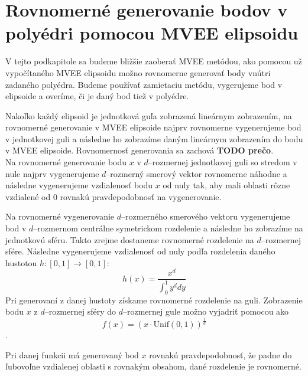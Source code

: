 \section {Rovnomerné generovanie bodov v polyédri pomocou MVEE elipsoidu}

V tejto podkapitole sa budeme bližšie zaoberať MVEE metódou, ako pomocou už vypočítaného MVEE elipsoidu možno rovnomerne generovať body vnútri zadaného polyédra. Budeme používať zamietaciu metódu, vygerujeme bod v elipsoide a overíme, či je daný bod tiež v polyédre.

Nakoľko každý elipsoid je jednotková guľa zobrazená lineárnym zobrazením, na rovnomerné generovanie v MVEE elipsoide najprv rovnomerne vygenerujeme bod v jednotkovej guli a následne ho zobrazíme daným lineárnym zobrazením do bodu v MVEE elipsoide. Rovnomernosť generovania sa zachová \textbf{TODO prečo}.\\

Na rovnomerné generovanie bodu $x$ v $d$--rozmernej jednotkovej guli so stredom v nule najprv vygenerujeme $d$--rozmerný smerový vektor rovnomerne náhodne a následne vygenerujeme vzdialenosť bodu $x$ od nuly tak, aby mali oblasti rôzne vzdialené od $0$ rovnakú pravdepodobnosť na vygenerovanie.

Na rovnomerné vygenerovanie $d$--rozmerného smerového vektoru vygenerujeme bod v $d$--rozmernom centrálne symetrickom rozdelenie a následne ho zobrazíme na jednotkovú sféru. Takto zrejme dostaneme rovnomerné rozdelenie na $d$--rozmernej sfére. Následne vygenerujeme vzdialenosť od nuly podľa rozdelenia daného hustotou $h:[0,1] \rightarrow [0,1]$: $$h(x)=\frac{x^d}{\int_0^1 y^d dy}$$
Pri generovaní z danej hustoty získame rovnomerné rozdelenie na guli. Zobrazenie bodu $x$ z $d$--rozmernej sféry do $d$--rozmernej gule možno vyjadriť pomocou  ako $$f(x)=(x\cdot\text{Unif}(0,1))^{\frac{1}{d}}$$.

Pri danej funkcii má generovaný bod $x$ rovnakú pravdepodobnosť, že padne do ľubovoľne vzdialenej oblasti s rovnakým obsahom, dané rozdelenie je rovnomerné.
